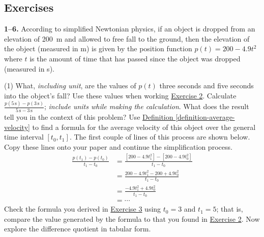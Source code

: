 \documentclass[10pt,oneside,]{book}
\theoremstyle{plain}
\theoremstyle{definition}
\numberwithin{equation}{section}
\newcounter{figstack}
\newlength\fight
\newcommand\pushValignCaptionBottom[5][b]{%
\stepcounter{figstack}%
\expandafter\def\csname %
figalign\romannumeral\value{figstack}\endcsname{#1}%
\expandafter\def\csname %
figtype\romannumeral\value{figstack}\endcsname{#2}%
\expandafter\def\csname %
figwd\romannumeral\value{figstack}\endcsname{#3}%
\expandafter\def\csname %
figcontent\romannumeral\value{figstack}\endcsname{#4}%
\expandafter\def\csname %
figcap\romannumeral\value{figstack}\endcsname{#5}%
\setbox0=\hbox{%
\begin{#2}{#3}#4\end{#2}}%
\ifdim\dimexpr\ht0+\dp0\relax>\fight\global\setlength{\fight}{%
\dimexpr\ht0+\dp0\relax}\fi%
}
\newcommand{\fe}[2]{#1\mathopen{}\left(#2\right)\mathclose{}}
\newcommand{\cinterval}[2]{\left[#1,#2\right]}
\begin{document}
\subsection[Exercises]{Exercises}\label{exercises-1}
\textbf{1--6. }\hypertarget{exercisegroup-1}{\null}According to simplified Newtonian physics, if an object is dropped from an elevation of \SI{200}{\meter} and allowed to free fall to the ground, then the elevation of the object (measured in \si{\meter}) is given by the position function \(\fe{p}{t}=200-4.9t^2\) where \(t\) is the amount of time that has passed since the object was dropped (measured in \si{\second}).%
\par
\begin{exercisegroup}(1)
\exercise[1.]\hypertarget{exercise-1}{\null}What, \emph{including unit}, are the values of \(\fe{p}{t}\) three seconds and five seconds into the object's fall? Use these values when working \hyperlink{exercise-average-velocity}{Exercise 2}.%
\exercise[2.]\hypertarget{exercise-average-velocity}{\null}Calculate \(\frac{\fe{p}{5\,\text{s}}-\fe{p}{3\,\text{s}}}{{5\,\text{s}}-{3\,\text{s}}}\); \emph{include units while making the calculation}. What does the result tell you in the context of this problem?%
\exercise[3.]\hypertarget{exercise-average-velocity-formula}{\null}Use \hyperref[definition-average-velocity]{Definition \ref{definition-average-velocity}} to find a formula for the average velocity of this object over the general time interval \(\cinterval{t_0}{t_1}\). The first couple of lines of this process are shown below. Copy these lines onto your paper and continue the simplification process.\begin{align*}
\frac{\fe{p}{t_1}-\fe{p}{t_0}}{t_1-t_0}&=\frac{\left[200-4.9t_1^2\right]-\left[200-4.9t_0^2\right]}{t_1-t_0}\\
&=\frac{200-4.9t_1^2-200+4.9t_0^2}{t_1-t_0}\\
&=\frac{-4.9t_1^2+4.9t_0^2}{t_1-t_0}\\
&=\cdots
\end{align*}%
\exercise[4.]\hypertarget{exercise-4}{\null}Check the formula you derived in \hyperlink{exercise-average-velocity-formula}{Exercise 3} using \(t_0=3\) and \(t_1=5\); that is, compare the value generated by the formula to that you found in \hyperlink{exercise-average-velocity}{Exercise 2}.%
\exercise[5.]\hypertarget{exercise-5}{\null}Now explore the difference quotient in tabular form.%
\end{exercisegroup}
\end{document}
